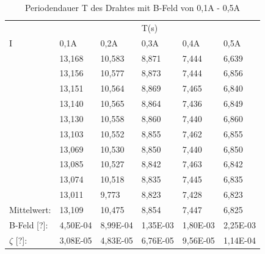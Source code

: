 \newpage
\begin{table}
    \caption{Periodendauer T des Drahtes mit B-Feld von 0,1A - 0,5A}
    \centering
    \begin{tabular}{p{3cm} | p{1.5cm} p{1.5cm} p{1.5cm} p{1.5cm} p{1.5cm}}
      &      &      & T(s) &      &     \\
    I & 0,1A & 0,2A & 0,3A & 0,4A & 0,5A\\
    \midrule
    & 13,168 & 10,583 & 8,871 &  7,444 &  6,639\\   
    & 13,156 & 10,577 & 8,873 &  7,444 &  6,856\\   
    & 13,151 & 10,564 & 8,869 &  7,465 &  6,840\\   
    & 13,140 & 10,565 & 8,864 &  7,436 &  6,849\\   
    & 13,130 & 10,558 & 8,860 &  7,440 &  6,860\\   
    & 13,103 & 10,552 & 8,855 &  7,462 &  6,855\\   
    & 13,069 & 10,530 & 8,850 &  7,440 &  6,850\\   
    & 13,085 & 10,527 & 8,842 &  7,463 &  6,842\\   
    & 13,074 & 10,518 & 8,835 &  7,445 &  6,835\\   
    & 13,011 &  9,773 & 8,823 &  7,428 &  6,823\\ 
    \midrule
    Mittelwert:    & 13,109 & 10,475 & 8,854 & 7,447 & 6,825 \\
    \midrule
    B-Feld [?]: & 4,50E-04 & 8,99E-04 & 1,35E-03 & 1,80E-03 & 2,25E-03\\
    $\zeta$ [?]: & 3,08E-05 & 4,83E-05 & 6,76E-05 & 9,56E-05 & 1,14E-04\\
    \bottomrule
    \end{tabular}
    \label{tab:tabelle_01A}
\end{table}



